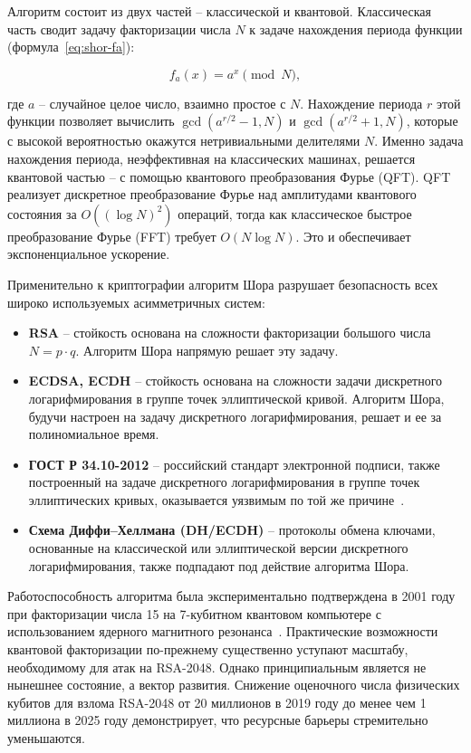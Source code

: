\documentclass{itmo-vkr}
\begin{document}
	Алгоритм состоит из двух частей -- классической и квантовой. Классическая часть сводит задачу факторизации числа $N$ к задаче нахождения периода функции (формула~\ref{eq:shor-fa}):

	\begin{equation}
		f_a(x) = a^x \pmod{N},
		\label{eq:shor-fa}
	\end{equation}

	\noindent где $a$ -- случайное целое число, взаимно простое с $N$. Нахождение периода $r$ этой функции позволяет вычислить $\gcd(a^{r/2} - 1, N)$ и $\gcd(a^{r/2} + 1, N)$, которые с высокой вероятностью окажутся нетривиальными делителями $N$. Именно задача нахождения периода, неэффективная на классических машинах, решается квантовой частью -- с помощью квантового преобразования Фурье (QFT). QFT реализует дискретное преобразование Фурье над амплитудами квантового состояния за $O((\log N)^2)$ операций, тогда как классическое быстрое преобразование Фурье (FFT) требует $O(N \log N)$. Это и обеспечивает экспоненциальное ускорение.
	
	Применительно к криптографии алгоритм Шора разрушает безопасность всех широко используемых асимметричных систем:
	
	\begin{itemize}
		\item \textbf{RSA} -- стойкость основана на сложности факторизации большого числа $N = p \cdot q$. Алгоритм Шора напрямую решает эту задачу.
		\item \textbf{ECDSA, ECDH} -- стойкость основана на сложности задачи дискретного логарифмирования в группе точек эллиптической кривой. Алгоритм Шора, будучи настроен на задачу дискретного логарифмирования, решает и ее за полиномиальное время.
		\item \textbf{ГОСТ Р 34.10-2012} -- российский стандарт электронной подписи, также построенный на задаче дискретного логарифмирования в группе точек эллиптических кривых, оказывается уязвимым по той же причине~\cite{kvantovyj-kompyuter-kriptostoykost}.
		\item \textbf{Схема Диффи–Хеллмана (DH/ECDH)} -- протоколы обмена ключами, основанные на классической или эллиптической версии дискретного логарифмирования, также подпадают под действие алгоритма Шора.
	\end{itemize}
	
	Работоспособность алгоритма была экспериментально подтверждена в 2001 году при факторизации числа 15 на 7-кубитном квантовом компьютере с использованием ядерного магнитного резонанса~\cite{vandersypen2001experimental}. Практические возможности квантовой факторизации по-прежнему существенно уступают масштабу, необходимому для атак на RSA-2048. Однако принципиальным является не нынешнее состояние, а вектор развития. Снижение оценочного числа физических кубитов для взлома RSA-2048 от 20 миллионов в 2019 году до менее чем 1 миллиона в 2025 году демонстрирует, что ресурсные барьеры стремительно уменьшаются.
	
\end{document}
